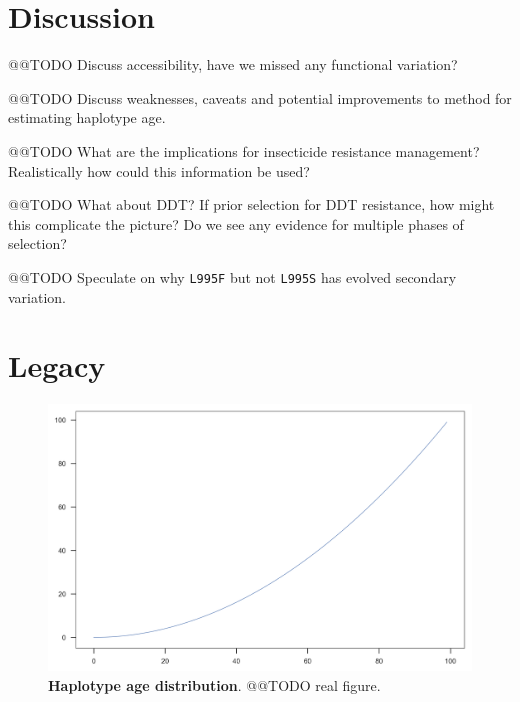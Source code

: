 \documentclass[a4paper,11pt,abstracton]{scrartcl}
\begin{document}
\section*{Discussion}


@@TODO Discuss accessibility, have we missed any functional variation?


@@TODO Discuss weaknesses, caveats and potential improvements to method for estimating haplotype age.


@@TODO What are the implications for insecticide resistance management? Realistically how could this information be used?


@@TODO What about DDT? If prior selection for DDT resistance, how might this complicate the picture? Do we see any evidence for multiple phases of selection?


@@TODO Speculate on why \texttt{L995F} but not \texttt{L995S} has evolved secondary variation.



\section*{Legacy}



%
\begin{figure}[!b]
  \includegraphics[width=1.1\linewidth,center]{artwork/demo.png}
  \caption{\textbf{Haplotype age distribution}. @@TODO real figure.}
  \label{fig:age_hist}
\end{figure}
\end{document}
